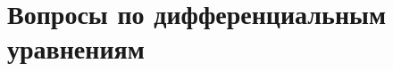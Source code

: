 \section{Вопросы по дифференциальным
уравнениям}\label{ux432ux43eux43fux440ux43eux441ux44b-ux43fux43e-ux434ux438ux444ux444ux435ux440ux435ux43dux446ux438ux430ux43bux44cux43dux44bux43c-ux443ux440ux430ux432ux43dux435ux43dux438ux44fux43c}
